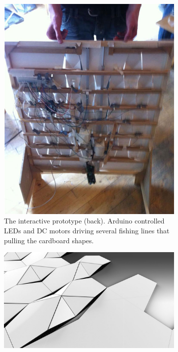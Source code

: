 \begin{figure}[ht]
\begin{subfigure}{.45\textwidth}
		\includegraphics[width=\linewidth]{figures/beomotion/prototype_back}
		\caption{The interactive prototype (back). Arduino controlled LEDs and DC motors driving several fishing lines that pulling the cardboard shapes.}
		\label{fig:beomotion:proto_back}
	\end{subfigure}
	\vspace{0.5cm}
	\begin{subfigure}{.45\textwidth}
		\centering
		\includegraphics[width=\linewidth]{figures/beomotion/concept}

\end{subfigure}
\end{figure}
